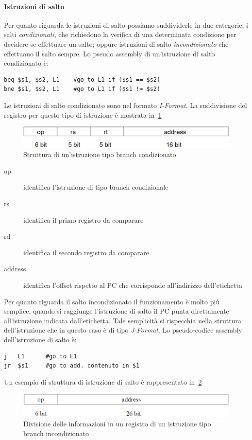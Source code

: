 \paragraph{Istruzioni di salto}
Per quanto riguarda le istruzioni di salto possiamo suddividerle in due categorie, i salti \emph{condizionati}, che richiedono la verifica di una determinata condizione per decidere se effettuare un salto; oppure istruzioni di salto \emph{incondizionato} che effettuano il salto sempre. 
Lo pseudo assembly di un'istruzione di salto condizionato è:
\begin{verbatim}
beq $s1, $s2, L1	#go to L1 if ($s1 == $s2)
bne $s1, $s2, L1	#go to L1 if ($s1 != $s2)
\end{verbatim}
Le istruzioni di salto condizionato sono nel formato \emph{I-Format}. La suddivisione del registro per questo tipo  di istruzione è mostrata in \figurename\,\ref{fig:condbranch}\\
\begin{figure}[htb]
\centering
\includegraphics[scale=0.4]{img/condbranch.png}
\caption{Struttura di un'istruzione tipo branch condizionato}\label{fig:condbranch}
\end{figure}
\begin{description}
\item[op] identifica l'istruzione di tipo branch condizionale
\item[rs] identifica il primo registro da comparare
\item[rd] identifica il secondo registro da comparare
\item[address] identifica l'offset rispetto al PC che corrisponde all'indirizzo dell'etichetta
\end{description}
Per quanto riguarda il salto incondizionato il funzionamento è molto più semplice, quando si raggiunge l'istruzione di salto il PC punta direttamente all'istruzione indicata dall'etichetta. Tale semplicità si rispecchia nella struttura dell'istruzione che in questo caso è di tipo \emph{J-Format}. 
Lo pseudo-codice assembly dell'istruzione di salto è:
\begin{verbatim}
j	L1		#go to L1
jr	$s1		#go to add. contenuto in $1
\end{verbatim}
Un esempio di struttura di istruzione di salto è rappresentato in \figurename\,\ref{fig:uncondbranch} 
\begin{figure}[htb]
\centering
\includegraphics[scale=0.4]{img/uncondbranch.png}
\caption{Divisione delle informazioni in un registro di un istruzione tipo branch incondizionato}\label{fig:uncondbranch}
\end{figure}
